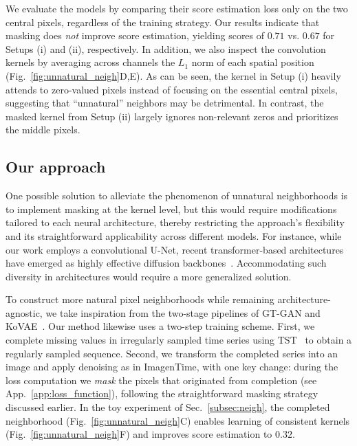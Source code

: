 \documentclass{article}
\theoremstyle{plain}
\theoremstyle{definition}
\theoremstyle{remark}
\begin{document}
We evaluate the models by comparing their score estimation loss only on the two central pixels, regardless of the training strategy. Our results indicate that masking does \emph{not} improve score estimation, yielding scores of $0.71$ vs. $0.67$ for Setups (i) and (ii), respectively. In addition, we also inspect the convolution kernels by averaging across channels the $L_1$ norm of each spatial position (Fig.~\ref{fig:unnatural_neigh}D,E). As can be seen, the kernel in Setup (i) heavily attends to zero-valued pixels instead of focusing on the essential central pixels, suggesting that ``unnatural'' neighbors may be detrimental. In contrast, the masked kernel from Setup (ii) largely ignores non-relevant zeros and prioritizes the middle pixels.



\vspace{-3mm}
\subsection{Our approach}
\vspace{-2mm}

One possible solution to alleviate the phenomenon of unnatural neighborhoods is to implement masking at the kernel level, but this would require modifications tailored to each neural architecture, thereby restricting the approach's flexibility and its straightforward applicability across different models. For instance, while our work employs a convolutional U-Net, recent transformer-based architectures have emerged as highly effective diffusion backbones~\cite{peebles2023scalable}. Accommodating such diversity in architectures would require a more generalized solution.


To construct more natural pixel neighborhoods while remaining architecture-agnostic, we take inspiration from the two-stage pipelines of GT-GAN and KoVAE~\cite{jeon2022gt,naiman2024generative}. Our method likewise uses a two-step training scheme. First, we complete missing values in irregularly sampled time series using TST~\cite{zerveas2021transformer} to obtain a regularly sampled sequence. Second, we transform the completed series into an image and apply denoising as in ImagenTime, with one key change: during the loss computation we \emph{mask} the pixels that originated from completion (see App.~\ref{app:loss_function}), following the straightforward masking strategy discussed earlier. In the toy experiment of Sec.~\ref{subsec:neigh}, the completed neighborhood (Fig.~\ref{fig:unnatural_neigh}C) enables learning of consistent kernels (Fig.~\ref{fig:unnatural_neigh}F) and improves score estimation to $0.32$.
\end{document}
